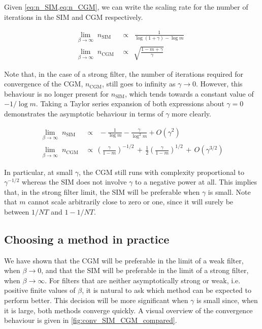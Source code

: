 Given \cref{eq:n_SIM,eq:n_CGM}, we can write the scaling rate for the number of iterations in the SIM and CGM respectively. 

\begin{align}
    \label{eq:n_SIM_SFL}
    \lim_{\beta \rightarrow \infty} \;  n_{\text{SIM}} \, & \propto \;\;  \frac{1}{\log(1 + \gamma) - \log m} \;\; \\[0.5cm]
    \lim_{\beta \rightarrow \infty} \;  n_{\text{CGM}} \, & \propto \;\, \sqrt{\frac{1 - m + \gamma}{\gamma}}
    \label{eq:n_CGM_SFL}
\end{align}
 

Note that, in the case of a strong filter, the number of iterations required for convergence of the CGM, $n_\text{CGM}$, still goes to infinity as $\gamma \rightarrow 0$. However, this behaviour is no longer present for $n_\text{SIM}$, which tends towards a constant value of $-1/\log m$. Taking a Taylor series expansion of both expressions about $\gamma=0$ demonstrates the asymptotic behaviour in terms of $\gamma$ more clearly. 


\begin{align}
    \lim_{\beta \rightarrow \infty} \;  n_{\text{SIM}} \, & \propto \;\;  -\frac{1}{\log m} - \frac{\gamma}{\log^2 m} + O\left(\gamma^2\right) \\[0.5cm]
    \lim_{\beta \rightarrow \infty} \;  n_{\text{CGM}} \, & \propto \, \left(\frac{\gamma}{1 - m} \right)^{-1/2} \, + \, \frac{1}{2}\left(\frac{\gamma}{1 - m}\right)^{1/2} \, + \, O\left(\gamma^{3/2}\right) 
\end{align}

In particular, at small $\gamma$, the CGM still runs with complexity proportional to $\gamma^{-1/2}$ whereas the SIM does not involve $\gamma$ to a negative power at all. This implies that, in the strong filter limit, the SIM will be preferable when $\gamma$ is small. Note that $m$ cannot scale arbitrarily close to zero or one, since it will surely be between $1/NT$ and $1 - 1/NT$. 



\subsection{Choosing a method in practice}

We have shown that the CGM will be preferable in the limit of a weak filter, when $\beta \rightarrow 0$, and that the SIM will be preferable in the limit of a strong filter, when $\beta \rightarrow \infty$. For filters that are neither asymptotically strong or weak, i.e. positive finite values of $\beta$, it is natural to ask which method can be expected to perform better. This decision will be more significant when $\gamma$ is small since, when it is large, both methods converge quickly. A visual overview of the convergence behaviour is given in \cref{fig:conv_SIM_CGM_compared}. 

